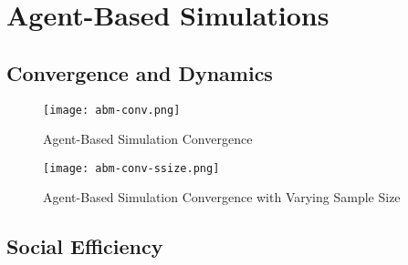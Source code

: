 \section{Agent-Based Simulations}
\label{sec:section4}  
\subsection{Convergence and Dynamics}

\begin{figure}[ht]\label{fig:abm-conv} 
    \centering
    \caption{Agent-Based Simulation Convergence}
    \texttt{[image: abm-conv.png]}
\end{figure}

\begin{figure}[ht]\label{fig:abm-conv-ssize} 
    \centering
    \caption{Agent-Based Simulation Convergence with Varying Sample Size}
    \texttt{[image: abm-conv-ssize.png]}
\end{figure}

\begin{comment}
\begin{itemize}
    \item Check Mass convergence
    \item Check distribution convergence
    \item Relate to ESS
    \item What about Dynamics??? BR
\end{itemize} 
\end{comment}
\subsection{Social Efficiency}


